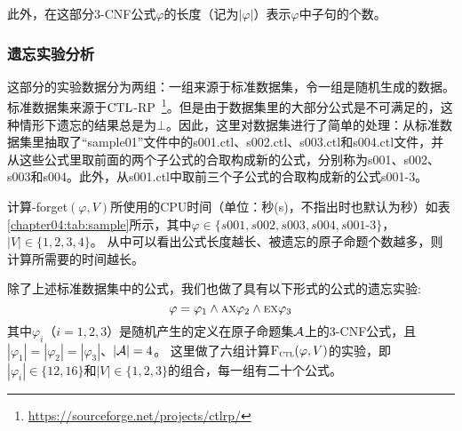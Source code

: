 	此外，在这部分3-CNF公式$\varphi$的长度（记为$|\varphi|$）表示$\varphi$中子句的个数。

\subsubsection{遗忘实验分析}
这部分的实验数据分为两组：一组来源于标准数据集，令一组是随机生成的数据。
标准数据集来源于$\textrm{CTL}$-RP~\footnote{\url{https://sourceforge.net/projects/ctlrp/}}。但是由于数据集里的大部分公式是不可满足的，这种情形下遗忘的结果总是为$\bot$。因此，这里对数据集进行了简单的处理：从标准数据集里抽取了“sample01”文件中的s001.ctl、s002.ctl、s003.ctl和s004.ctl文件，并从这些公式里取前面的两个子公式的合取构成新的公式，分别称为s001、s002、s003和s004。此外，从s001.ctl中取前三个子公式的合取构成新的公式s001-3。

计算{\CTL-forget}$(\varphi, V)$所使用的CPU时间（单位：秒(s)，不指出时也默认为秒）如表\ref{chapter04:tab:sample}所示，其中$\varphi\in \{s001,s002,s003,s004,s001$-$3\}$，$|V|\in \{1,2,3,4\}$。
从中可以看出公式长度越长、被遗忘的原子命题个数越多，则计算所需要的时间越长。

\begin{table}%
	\small
	\centering
	\caption{计算 {\CTL-forget}$(\varphi, V)$所使用的CPU时间（单位：秒(s)）}\label{chapter04:tab:sample}
\end{table}

除了上述标准数据集中的公式，我们也做了具有以下形式的公式的遗忘实验:
$$\varphi=\varphi_1 \wedge \textsc{a}\textsc{x} \varphi_2 \wedge \textsc{e}\textsc{x} \varphi_3$$
其中$\varphi_i$（$i=1,2,3$）是随机产生的定义在原子命题集${\cal A}$上的3-CNF公式，且$|\varphi_1| = |\varphi_2| =|\varphi_3|$、$|{\cal A}|=4$。
这里做了六组计算${\textsc{F}_{\textsc{ctl}}}(\varphi,V)$的实验，即$|\varphi_i| \in \{12,16\}$和$|V|\in \{1,2,3\}$的组合，每一组有二十个公式。

